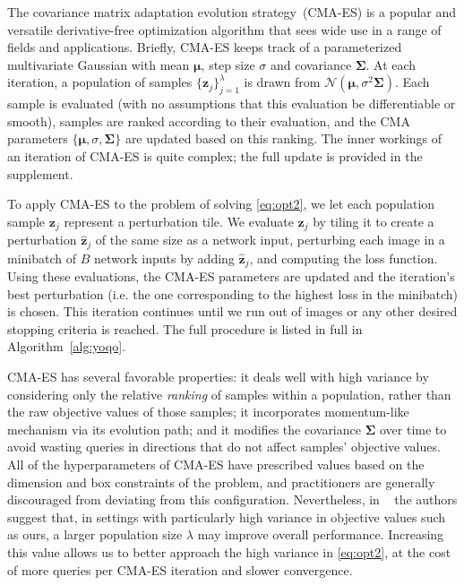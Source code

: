 \documentclass[letterpaper]{article}
\begin{document}
	The covariance matrix adaptation evolution strategy~(CMA-ES) \cite{hansen2016cma} is a popular and versatile derivative-free optimization algorithm that sees wide use in a range of fields and applications. Briefly, CMA-ES keeps track of a parameterized multivariate Gaussian with mean $\boldsymbol{\mu}$, step size $\sigma$ and covariance $\bm{\Sigma}$. At each iteration, a population of samples $\{\mathbf{z}_j\}_{j=1}^\lambda$ is drawn from $\mathcal{N}(\boldsymbol{\mu}, \sigma^2 \bm\Sigma)$. Each sample is evaluated (with no assumptions that this evaluation be differentiable or smooth), samples are ranked according to their evaluation, and the CMA parameters $\{\boldsymbol{\mu}, \sigma, \bm{\Sigma}\}$ are updated based on this ranking. The inner workings of an iteration of CMA-ES is quite complex; the full update is provided in the supplement.
	
	To apply CMA-ES to the problem of solving \eqref{eq:opt2}, we let each population sample $\mathbf{z}_j$ represent a perturbation tile. We evaluate $\mathbf{z}_j$ by tiling it to create a perturbation $\mathbf{\hat z}_j$ of the same size as a network input, perturbing each image in a minibatch of $B$ network inputs by adding $\mathbf{\hat z}_j$, and computing the loss function. Using these evaluations, the CMA-ES parameters are updated and the iteration's best perturbation (i.e. the one corresponding to the highest loss in the minibatch) is chosen. This iteration continues until we run out of images or any other desired stopping criteria is reached. The full procedure is listed in full in Algorithm~\ref{alg:yoqo}.
	
	CMA-ES has several favorable properties: it deals well with high variance by considering only the relative \emph{ranking} of samples within a population, rather than the raw objective values of those samples; it incorporates momentum-like mechanism via its evolution path; and it modifies the covariance $\bm{\Sigma}$ over time to avoid wasting queries in directions that do not affect samples' objective values. All of the hyperparameters of CMA-ES have prescribed values based on the dimension and box constraints of the problem, and practitioners are generally discouraged from deviating from this configuration. Nevertheless, in ~\cite{hansen2016cma} the authors suggest that, in settings with particularly high variance in objective values such as ours, a larger population size $\lambda$ may improve overall performance. Increasing this value allows us to better approach the high variance in \eqref{eq:opt2}, at the cost of more queries per CMA-ES iteration and slower convergence.
	
\end{document}
